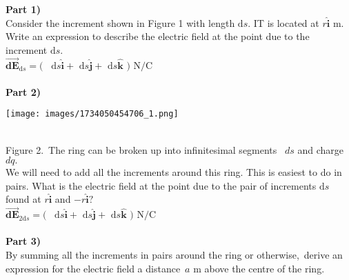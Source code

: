 \documentclass[addpoints,12pt, margin-left=35px]{exam}
\begin{document}
\textbf{Part 1)}\\

Consider the increment shown in Figure 1 with length $\mathrm{d} s.$ IT is located at $r \mathbf{\hat{i}} \text{ m.}$ Write an expression to describe the electric field at the point due to the increment $\mathrm{d} s.$\\

$\mathbf{\vec{dE}}_{\mathrm{d} s} = ( $  \underline{\hspace{3cm}}  $\mathrm{d} s \mathbf{\hat{i}} + $  \underline{\hspace{3cm}}  $\mathrm{d} s \mathbf{\hat{j}} + $ \underline{\hspace{3cm}}  $\mathrm{d} s \mathbf{\hat{k}} \text{ ) N/C}$ \\

\\

\textbf{Part 2)}\\

\begin{center}
\texttt{[image: images/1734050454706\_1.png]}
\end{center}\\

Figure 2. The ring can be broken up into infinitesimal segments   $ds$  and charge   $dq .$\\

We will need to add all the increments around this ring. This is easiest to do in pairs. What is the electric field at the point due to the pair of increments $\mathrm{d} s$ found at $r \mathbf{\hat{i}}$ and $-r \mathbf{\hat{i}}?$\\

$\mathbf{\vec{dE}}_{2 \mathrm{d} s} = ( $  \underline{\hspace{3cm}}  $\mathrm{d} s \mathbf{\hat{i}} + $  \underline{\hspace{3cm}}  $\mathrm{d} s \mathbf{\hat{j}} + $ \underline{\hspace{3cm}}  $\mathrm{d} s \mathbf{\hat{k}} \text{ ) N/C}$ \\

\\

\textbf{Part 3)}\\

By summing all the increments in pairs around the ring or otherwise, derive an expression for the electric field a distance $a \text{ m}$ above the centre of the ring.\\
\end{document}
